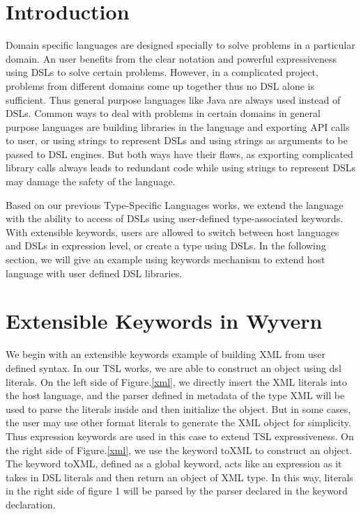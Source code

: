 \documentclass[letterpaper, notitlepage]{article}
\begin{document}
\section{Introduction}
Domain specific languages are designed specially to solve problems in a particular domain. An user benefits from the clear notation and powerful expressiveness using DSLs to solve certain problems. However, in a complicated project, problems from different domains come up together thus no DSL alone is sufficient. Thus general purpose languages like Java are always used instead of DSLs. Common ways to deal with problems in certain domains in general purpose languages are building libraries in the language and exporting API calls to user, or using strings to represent DSLs and using strings as arguments to be passed to DSL engines. But both ways have their flaws, as exporting complicated library calls always leads to redundant code while using strings to represent DSLs may damage the safety of the language.
\par
Based on our previous Type-Specific Languages works, we extend the language with the ability to access of DSLs using user-defined type-associated keywords. With extensible keywords, users are allowed to switch between host languages and DSLs in expression level, or create a type using DSLs. In the following section, we will give an example using keywords mechanism to extend host language with user defined DSL libraries.

\section{Extensible Keywords in Wyvern}
We begin with an extensible keywords example of building XML from user defined syntax. In our TSL works, we are able to construct an object using dsl literals. On the left side of Figure.\ref{xml}, we directly insert the XML literals into the host language, and the parser defined in metadata of the type XML will be used to parse the literals inside and then initialize the object. But in some cases, the user may use other format literals to generate the XML object for simplicity. Thus expression keywords are used in this case to extend TSL expressiveness. On the right side of Figure.\ref{xml}, we use the keyword toXML to construct an object. The keyword toXML, defined as a global keyword, acts like an expression as it takes in DSL literals and then return an object of XML type. In this way, literals in the right side of figure 1 will be parsed by the parser declared in the keyword declaration. 
\end{document}
